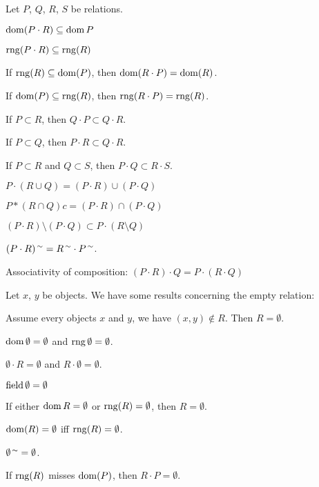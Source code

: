 \documentclass{article}
\begin{document}
Let $P$, $Q$, $R$, $S$ be relations.
\begin{thm}
\item\label{relat1:25} $\operatorname{dom}(P\cdot R)\subseteq\operatorname{dom} P$
\item\label{relat1:26} $\operatorname{rng}(P\cdot R)\subseteq\operatorname{rng}(R)$
\item\label{relat1:27} If $\operatorname{rng}(R)\subseteq\operatorname{dom}(P)$, then $\operatorname{dom}(R\cdot P)=\operatorname{dom}(R)$.
\item\label{relat1:28} If $\operatorname{dom}(P)\subseteq\operatorname{rng}(R)$, then $\operatorname{rng}(R\cdot P)=\operatorname{rng}(R)$.
\item\label{relat1:29} If $P\subset R$, then $Q\cdot P\subset Q\cdot R$.
\item\label{relat1:30} If $P\subset Q$, then $P\cdot R\subset Q\cdot R$.
\item\label{relat1:31} If $P\subset R$ and $Q\subset S$,
  then $P\cdot Q\subset R\cdot S$.
\item\label{relat1:32} $P\cdot(R\cup Q)=(P\cdot R)\cup(P\cdot Q)$
\item\label{relat1:33} $P*(R \cap Q) c= (P\cdot R) \cap (P\cdot Q)$
\item\label{relat1:34} $(P\cdot R) \setminus (P\cdot Q) \subset P\cdot(R \setminus Q)$
\item\label{relat1:35} $(P\cdot R)^{\,\sim} = R^{\,\sim}\cdot P^{\,\sim}$.
\item\label{relat1:36}%
Associativity of composition:
  $(P\cdot R)\cdot Q = P\cdot(R\cdot Q)$
\end{thm}

Let $x$, $y$ be objects.
We have some results concerning the empty relation:
\begin{thm}
\item\label{relat1:37} Assume every objects $x$ and $y$, we have
  $(x,y)\notin R$. Then $R=\emptyset$.
\item\label{relat1:38} $\operatorname{dom}\emptyset=\emptyset$ and $\operatorname{rng}\emptyset=\emptyset$.
\item\label{relat1:39} $\emptyset\cdot R=\emptyset$ and $R\cdot\emptyset=\emptyset$.
\item\label{relat1:40} $\operatorname{field}\emptyset=\emptyset$
\item\label{relat1:41} If either $\operatorname{dom} R=\emptyset$ or
  $\operatorname{rng}(R)=\emptyset$, then $R=\emptyset$.
\item\label{relat1:42} $\operatorname{dom}(R)=\emptyset$ iff  $\operatorname{rng}(R)=\emptyset$.
\item\label{relat1:43} $\emptyset^{\,\sim}=\emptyset$.
\item\label{relat1:44} If $\operatorname{rng}(R)$ misses $\operatorname{dom}(P)$, then $R\cdot P=\emptyset$.
\end{thm}
\end{document}
